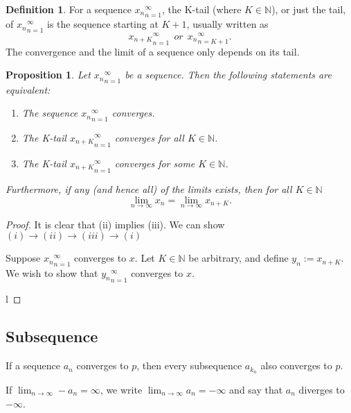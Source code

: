 \documentclass{article}
\newtheorem{prop}[theorem]{Proposition}
\theoremstyle{definition}
\newtheorem{defi}{Definition}[section]
\begin{document}
\begin{defi}
For a sequence ${x_{n}}_{n=1}^{\infty}$, the K-tail (where $K\in \mathbb{N}$), or just the tail, of ${x_{n}}_{n=1}^{\infty}$ is the sequence starting at $K+1$, usually written as 
$${x_{n+K}}_{n=1}^{\infty}\ \ or \ \ {x_{n}}_{n=K+1}^{\infty}.$$
The convergence and the limit of a sequence only depends on its tail.
\end{defi}

\begin{prop}
Let ${x_{n}}_{n=1}^{\infty}$ be a sequence. Then the following statements are equivalent:
\begin{enumerate}[label=(i)]
    \item The sequence ${x_{n}}_{n=1}^{\infty}$ converges.
    \item The K-tail ${x_{n+K}}_{n=1}^{\infty}$ converges for all $K\in \mathbb{N}$.
    \item The K-tail ${x_{n+K}}_{n=1}^{\infty}$ converges for some $K\in \mathbb{N}$.
\end{enumerate}

Furthermore, if any (and hence all) of the limits exists, then for all $K\in \mathbb{N}$
$$\lim_{n\to \infty}x_{n}=\lim_{n\to \infty}x_{n+K}.$$

\end{prop}

\begin{proof}
It is clear that (ii) implies (iii). We can show $(i)\to (ii)\to (iii)\to (i)$

Suppose ${x_{n}}_{n=1}^{\infty}$ converges to $x$. Let $K\in \mathbb{N}$ be arbitrary, and define $y_{n}:=x_{n+K}$. We wish to show that ${y_{n}}_{n=1}^{\infty}$ converges to $x$.

l

\end{proof}







\subsection{Subsequence}
If a sequence ${a_{n}}$ converges to $p$, then every subsequence ${a_{k_{n}}}$ 
also converges to $p$.



If $\lim_{n\rightarrow\infty}-a_{n}=\infty$, we write $\lim_{n\rightarrow\infty}a_{n}=-\infty$ and say that $a_{n}$ 
diverges to $-\infty$. 
\end{document}
